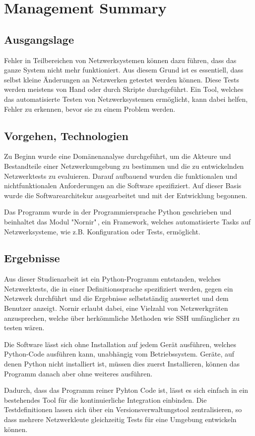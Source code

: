 \documentclass[]{subfiles}
\begin{document}
\section*{Management Summary}
   \subsection*{Ausgangslage}
   Fehler in Teilbereichen von Netzwerksystemen können dazu führen, 
   dass das ganze System nicht mehr funktioniert.
   Aus diesem Grund ist es essentiell, dass selbst kleine Änderungen
   an Netzwerken getestet werden können. 
   Diese Tests werden meistens von Hand oder durch Skripte durchgeführt.
   Ein Tool, welches das automatisierte Testen von Netzwerksystemen 
   ermöglicht, kann dabei helfen, Fehler zu erkennen, bevor sie zu
   einem Problem werden.

   \subsection*{Vorgehen, Technologien}
   Zu Beginn wurde eine Domänenanalyse durchgeführt, um die Akteure und 
   Bestandteile einer Netzwerkumgebung zu bestimmen und die zu entwickelnden
   Netzwerktests zu evaluieren.
   Darauf aufbauend wurden die funktionalen und nichtfunktionalen Anforderungen
   an die Software spezifiziert.
   Auf dieser Basis wurde die Softwarearchitekur ausgearbeitet und mit 
   der Entwicklung begonnen.

   Das Programm wurde in der Programmiersprache Python geschrieben und 
   beinhaltet das Modul "Nornir"\,, ein Framework, welches automatisierte
   Tasks auf Netzwerksysteme, wie z.B. Konfiguration oder Tests, ermöglicht. 

   \subsection*{Ergebnisse}
   Aus dieser Studienarbeit ist ein Python-Programm entstanden, welches 
   Netzwerktests, die in einer Definitionssprache spezifiziert werden,
   gegen ein Netzwerk durchführt und die Ergebnisse selbstständig auswertet
   und dem Benutzer anzeigt. Nornir erlaubt dabei, eine Vielzahl von 
   Netzwerkgräten anzusprechen, welche über herkömmliche Methoden wie
   SSH umfänglicher zu testen wären.

   Die Software lässt sich ohne Installation auf jedem Gerät ausführen, 
   welches Python-Code ausführen kann, unabhängig vom Betriebssystem.
   Geräte, auf denen Python nicht installiert ist, müssen dies zuerst
   Installieren, können das Programm danach aber ohne weiteres ausführen.

   Dadurch, dass das Programm reiner Pyhton Code ist, lässt es sich einfach
   in ein bestehendes Tool für die kontinuierliche Integration einbinden.
   Die Testdefinitionen lassen sich über ein Versionsverwaltungstool 
   zentralisieren, so dass mehrere Netzwerkleute gleichzeitig Tests für 
   eine Umgebung entwickeln können. 
   
\end{document}
